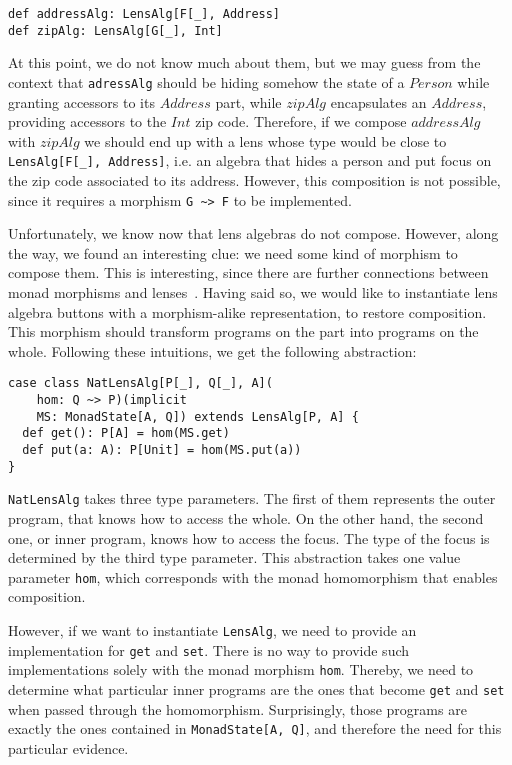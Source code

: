 \documentclass[final, twocolumn, 3p]{elsarticle}
\begin{document}
\begin{lstlisting}
def addressAlg: LensAlg[F[_], Address]
def zipAlg: LensAlg[G[_], Int]
\end{lstlisting}

At this point, we do not know much about them, but we may guess from the context
that \lstinline{adressAlg} should be hiding somehow the state of a $Person$
while granting accessors to its $Address$ part, while $zipAlg$ encapsulates an
$Address$, providing accessors to the $Int$ zip code. Therefore, if we compose
$addressAlg$ with $zipAlg$ we should end up with a lens whose type would be
close to \lstinline{LensAlg[F[_], Address]}, i.e. an algebra that hides a person
and put focus on the zip code associated to its address. However, this
composition is not possible, since it requires a morphism \lstinline{G ~> F} to
be implemented.

Unfortunately, we know now that lens algebras do not compose. However, along the
way, we found an interesting clue: we need some kind of morphism to compose
them. This is interesting, since there are further connections between monad
morphisms and lenses~\cite{abou2015notions}. Having said so, we would like to
instantiate lens algebra buttons with a morphism-alike representation, to
restore composition. This morphism should transform programs on the part into
programs on the whole. Following these intuitions, we get the following
abstraction:

\begin{lstlisting}
case class NatLensAlg[P[_], Q[_], A](
    hom: Q ~> P)(implicit
    MS: MonadState[A, Q]) extends LensAlg[P, A] {
  def get(): P[A] = hom(MS.get)
  def put(a: A): P[Unit] = hom(MS.put(a))
}
\end{lstlisting}

\lstinline{NatLensAlg} takes three type parameters. The first of them represents
the outer program, that knows how to access the whole. On the other hand, the
second one, or inner program, knows how to access the focus. The type of the
focus is determined by the third type parameter. This abstraction takes one
value parameter \lstinline{hom}, which corresponds with the monad homomorphism
that enables composition.

However, if we want to instantiate \lstinline{LensAlg}, we need to provide an
implementation for \lstinline{get} and \lstinline{set}. There is no way to
provide such implementations solely with the monad morphism \lstinline{hom}.
Thereby, we need to determine what particular inner programs are the ones that
become \lstinline{get} and \lstinline{set} when passed through the homomorphism.
Surprisingly, those programs are exactly the ones contained in
\lstinline{MonadState[A, Q]}, and therefore the need for this particular
evidence.
\end{document}
